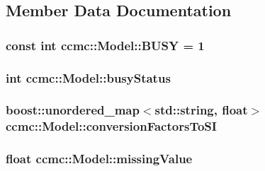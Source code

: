\subsection{Member Data Documentation}
\hypertarget{classccmc_1_1_model_a2455ad851ac80f63d5d0af2c6c77cfcc}{
\subsubsection[{B\-U\-S\-Y}]{\setlength{\rightskip}{0pt plus 5cm}const int ccmc\-::\-Model\-::\-B\-U\-S\-Y = 1\hspace{0.3cm}{\ttfamily [static]}}}\label{classccmc_1_1_model_a2455ad851ac80f63d5d0af2c6c77cfcc}
\hypertarget{classccmc_1_1_model_acee07d9abc8cb8c0bc3fbaeb879cc251}{
\subsubsection[{busy\-Status}]{\setlength{\rightskip}{0pt plus 5cm}int ccmc\-::\-Model\-::busy\-Status\hspace{0.3cm}{\ttfamily [protected]}}}\label{classccmc_1_1_model_acee07d9abc8cb8c0bc3fbaeb879cc251}
\hypertarget{classccmc_1_1_model_ab62ff417dd01ef7137490747cb0b3641}{
\subsubsection[{conversion\-Factors\-To\-S\-I}]{\setlength{\rightskip}{0pt plus 5cm}boost\-::unordered\-\_\-map$<$std\-::string, float$>$ ccmc\-::\-Model\-::conversion\-Factors\-To\-S\-I\hspace{0.3cm}{\ttfamily [protected]}}}\label{classccmc_1_1_model_ab62ff417dd01ef7137490747cb0b3641}
\hypertarget{classccmc_1_1_model_ae18cabca92352739be2b97f0ee973475}{
\subsubsection[{missing\-Value}]{\setlength{\rightskip}{0pt plus 5cm}float ccmc\-::\-Model\-::missing\-Value\hspace{0.3cm}{\ttfamily [protected]}}}\label{classccmc_1_1_model_ae18cabca92352739be2b97f0ee973475}
